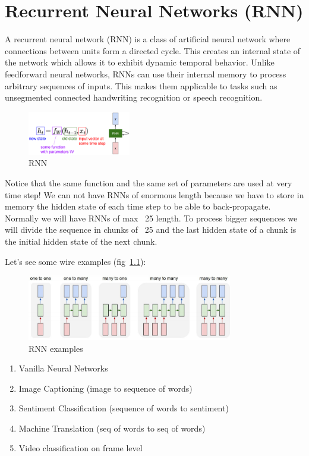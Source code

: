\chapter{Recurrent Neural Networks (RNN)}

A recurrent neural network (RNN) is a class of artificial neural network where connections between units form a directed cycle. This creates an internal state of the network which allows it to exhibit dynamic temporal behavior. Unlike feedforward neural networks, RNNs can use their internal memory to process arbitrary sequences of inputs. This makes them applicable to tasks such as unsegmented connected handwriting recognition or speech recognition.

\begin{figure}[h]
  \centering
  \includegraphics[width=0.4\textwidth]{Images/recurrent_neural_networks/1.png}
  \caption{RNN}
\end{figure}

Notice that the same function and the same set of parameters are used at very time step!
We can not have RNNs of enormous length because we have to store in memory the hidden state of each time step to be able to back-propagate. Normally we will have RNNs of max ~25 length.  To process bigger sequences we will divide the sequence in chunks of ~25 and the last hidden state of a chunk is the initial hidden state of the next chunk.

Let's see some wire examples (fig~\ref{fig:rnn_examples}):
\begin{figure}[h]
  \centering
  \includegraphics[width=0.8\textwidth]{Images/recurrent_neural_networks/2.png}
  \caption{RNN examples}
  \label{fig:rnn_examples}
\end{figure}
\begin{enumerate}
\item Vanilla Neural Networks
\item Image Captioning (image to sequence of words)
\item Sentiment Classification (sequence of words to sentiment)
\item Machine Translation (seq of words to seq of words)
\item Video classification on frame level
\end{enumerate}


